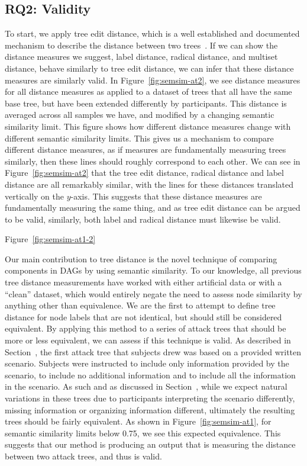 \subsection{RQ2: Validity}

To start, we apply tree edit distance, which is a well established and documented mechanism to describe the distance between two trees~\cite{Zhang_Shasha_1989,zhang_editing_1992,akutsu_tree_2021,pawlik_rted_2011,mcvicar_sumoted_2016}. If we can show the distance measures we suggest, label distance, radical distance, and multiset distance, behave similarly to tree edit distance, we can infer that these distance measures are similarly valid. In Figure~\ref{fig:semsim-at2}, we see distance measures for all distance measures as applied to a dataset of trees that all have the same base tree, but have been extended differently by participants. This distance is averaged across all samples we have, and modified by a changing semantic similarity limit. This figure shows how different distance measures change with different semantic similarity limits. This gives us a mechanism to compare different distance measures, as if measures are fundamentally measuring trees similarly, then these lines should roughly correspond to each other. We can see in Figure~\ref{fig:semsim-at2} that the tree edit distance, radical distance and label distance are all remarkably similar, with the lines for these distances translated vertically on the $y$-axis. This suggests that these distance measures are fundamentally measuring the same thing, and as tree edit distance can be argued to be valid, similarly, both label and radical distance must likewise be valid.

Figure~\ref{fig:semsim-at1-2}

Our main contribution to tree distance is the novel technique of comparing components in DAGs by using semantic similarity. To our knowledge, all previous tree distance measurements have worked with either artificial data or with a ``clean'' dataset, which would entirely negate the need to assess node similarity by anything other than equivalence. We are the first to attempt to define tree distance for node labels that are not identical, but should still be considered equivalent. By applying this method to a series of attack trees that should be more or less equivalent, we can assess if this technique is valid. As described in Section~, the first attack tree that subjects drew was based on a provided written scenario. Subjects were instructed to include only information provided by the scenario, to include no additional information and to include all the information in the scenario. As such and as discussed in Section~, while we expect natural variations in these trees due to participants interpreting the scenario differently, missing information or organizing information different, ultimately the resulting trees should be fairly equivalent. As shown in Figure~\ref{fig:semsim-at1}, for semantic similarity limits  below 0.75, we see this expected equivalence. This suggests that our method is producing an output that is measuring the distance between two attack trees, and thus is valid.

